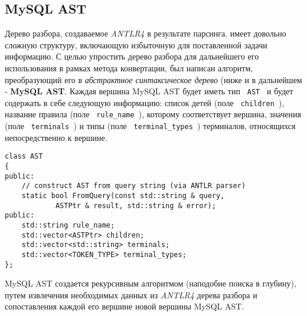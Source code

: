 \subsection{MySQL AST}
Дерево разбора, создаваемое \textit{ANTLR4} в результате парсинга, имеет довольно сложную структуру, включающую избыточную для поставленной задачи информацию. С целью упростить дерево разбора для дальнейшего его использования в рамках метода конвертации, был написан алгоритм, преобразующий его в \textit{абстрактное синтаксическое дерево} (ниже и в дальнейшем - \textbf{MySQL AST}. Каждая вершина MySQL AST будет иметь тип \texttt{ AST } и будет содержать в себе следующую информацию: список детей (поле \texttt{ children }), название правила (поле \texttt{ rule_name }), которому соответствует вершина, значения (поле \texttt{ terminals }) и типы (поле \texttt{  terminal_types }) терминалов, относящихся непосредственно к вершине. 

\begin{code}
    \label{mysql:AST_cpp}
    \begin{verbatim}
class AST
{
public:
    // construct AST from query string (via ANTLR parser)
    static bool FromQuery(const std::string & query,
            ASTPtr & result, std::string & error);
public:
    std::string rule_name;
    std::vector<ASTPtr> children;
    std::vector<std::string> terminals;
    std::vector<TOKEN_TYPE> terminal_types;
};
    \end{verbatim}
\end{code}

MySQL AST создается рекурсивным алгоритмом (наподобие поиска в глубину), путем извлечения необходимых данных из \textit{ANTLR4} дерева разбора и сопоставления каждой его вершине новой вершины MySQL AST.

